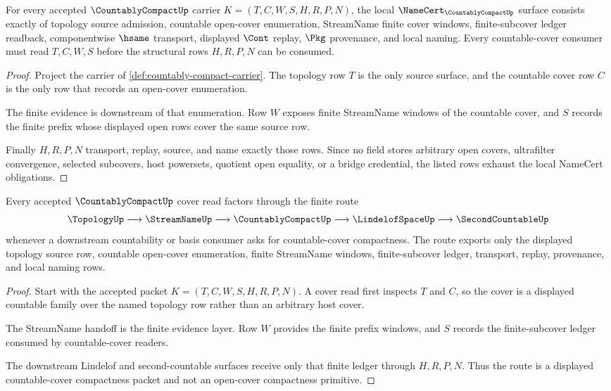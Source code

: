 \begin{theorem}
\label{thm:countably-compact-namecert-obligations}
For every accepted $\CountablyCompactUp$ carrier $K=(T,C,W,S,H,R,P,N)$, the local $\NameCert_{\CountablyCompactUp}$ surface consists exactly of topology source admission, countable open-cover enumeration, StreamName finite cover windows, finite-subcover ledger readback, componentwise $\hsame$ transport, displayed $\Cont$ replay, $\Pkg$ provenance, and local naming. Every countable-cover consumer must read $T,C,W,S$ before the structural rows $H,R,P,N$ can be consumed.
\end{theorem}
\begin{proof}
Project the carrier of \autoref{def:countably-compact-carrier}. The topology row $T$ is the only source surface, and the countable cover row $C$ is the only row that records an open-cover enumeration.

The finite evidence is downstream of that enumeration. Row $W$ exposes finite StreamName windows of the countable cover, and $S$ records the finite prefix whose displayed open rows cover the same source row.

Finally $H,R,P,N$ transport, replay, source, and name exactly those rows. Since no field stores arbitrary open covers, ultrafilter convergence, selected subcovers, host powersets, quotient open equality, or a bridge credential, the listed rows exhaust the local NameCert obligations.
\end{proof}

\begin{theorem}
\label{thm:countably-compact-streamname-cover-route}
Every accepted $\CountablyCompactUp$ cover read factors through the finite route
$$
\TopologyUp \longrightarrow \StreamNameUp \longrightarrow \CountablyCompactUp \longrightarrow \LindelofSpaceUp \longrightarrow \SecondCountableUp
$$
whenever a downstream countability or basis consumer asks for countable-cover compactness. The route exports only the displayed topology source row, countable open-cover enumeration, finite StreamName windows, finite-subcover ledger, transport, replay, provenance, and local naming rows.
\end{theorem}
\begin{proof}
Start with the accepted packet $K=(T,C,W,S,H,R,P,N)$. A cover read first inspects $T$ and $C$, so the cover is a displayed countable family over the named topology row rather than an arbitrary host cover.

The StreamName handoff is the finite evidence layer. Row $W$ provides the finite prefix windows, and $S$ records the finite-subcover ledger consumed by countable-cover readers.

The downstream Lindelof and second-countable surfaces receive only that finite ledger through $H,R,P,N$. Thus the route is a displayed countable-cover compactness packet and not an open-cover compactness primitive.
\end{proof}

